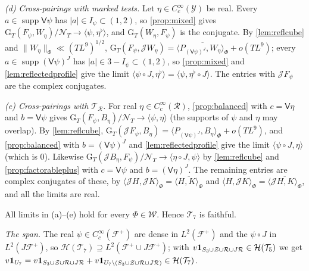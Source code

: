 \documentclass[11pt,colorlinks]{charlie}
\newcommand{\ip}[2]{\langle #1,#2\rangle}
\begin{document}
\emph{(d) Cross-pairings with marked tests.} Let $\eta\in C_c^\infty(\mathcal Y)$ be real. Every $a\in\operatorname{supp}\mathsf V\psi$ has $|a|\in I_\psi\subset(1,2)$, so \cref{prop:mixed} gives $\mathrm G_T(F_\psi,W_\eta)/\mathcal N_T\to\ip\psi{\eta^\flat}$, and $\mathrm G_T(W_\eta,F_\psi)$ is the conjugate. By \cref{lem:reflcube} and $\|W_\eta\|_\Phi\ll(TL^9)^{1/2}$, $\mathrm G_T(F_\psi,\mathcal JW_\eta)=\overline{\ip{P_{(\mathsf V\psi)^J}}{W_\eta}_\Phi}+o(TL^9)$; every $a\in\operatorname{supp}(\mathsf V\psi)^J$ has $|a|\in3-I_\psi\subset(1,2)$, so \cref{prop:mixed} and \cref{lem:reflectedprofile} give the limit $\ip{\psi\circ J}{\eta^\flat}=\ip\psi{\eta^\flat\circ J}$. The entries with $\mathcal JF_\psi$ are the complex conjugates.

\emph{(e) Cross-pairings with $\mathcal T_{\mathcal R}$.} For real $\eta\in C_c^\infty(\mathcal R)$, \cref{prop:balanced} with $c=\mathsf V\eta$ and $b=\mathsf V\psi$ gives $\mathrm G_T(F_\psi,B_\eta)/\mathcal N_T\to\ip\psi\eta$ (the supports of $\psi$ and $\eta$ may overlap). By \cref{lem:reflcube}, $\mathrm G_T(\mathcal JF_\psi,B_\eta)=\ip{P_{(\mathsf V\psi)^J}}{B_\eta}_\Phi+o(TL^9)$, and \cref{prop:balanced} with $b=(\mathsf V\psi)^J$ and \cref{lem:reflectedprofile} give the limit $\ip{\psi\circ J}\eta$ (which is $0$). Likewise $\mathrm G_T(\mathcal JB_\eta,F_\psi)/\mathcal N_T\to\ip{\eta\circ J}\psi$ by \cref{lem:reflcube} and \cref{prop:factorableplus} with $c=\mathsf V\psi$ and $b=(\mathsf V\eta)^J$. The remaining entries are complex conjugates of these, by $\ip{\mathcal JH}{\mathcal JK}_\Phi=\overline{\ip HK_\Phi}$ and $\ip H{\mathcal JK}_\Phi=\overline{\ip{\mathcal JH}K_\Phi}$, and all the limits are real.

All limits in (a)--(e) hold for every $\Phi\in\mathcal W$. Hence $\mathcal T_7$ is faithful.

\emph{The span.} The real $\psi\in C_c^\infty(\mathcal F^+)$ are dense in $L^2(\mathcal F^+)$ and the $\psi\circ J$ in $L^2(J\mathcal F^+)$, so $\mathcal H(\mathcal T_7)\supseteq L^2(\mathcal F^+\cup J\mathcal F^+)$; with $v\mathbf{1}_{S_3\cup\mathcal Z\cup\mathcal R\cup J\mathcal R}\in\mathcal H(\mathcal T_5)$ we get $v\mathbf{1}_{U_7}=v\mathbf{1}_{S_3\cup\mathcal Z\cup\mathcal R\cup J\mathcal R}+v\mathbf{1}_{U_7\setminus(S_3\cup\mathcal Z\cup\mathcal R\cup J\mathcal R)}\in\mathcal H(\mathcal T_7)$.
\end{document}
